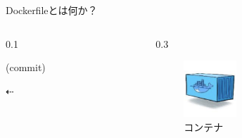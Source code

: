 \begin{frame}{Dockerfileとは何か？}
\begin{columns}[totalwidth=\mytotalwidth]
\begin{column}[T]{0.1\mycolumnwidth}
            \centerline{\footnotesize (commit)}
            \centerline{$\dashleftarrow$}
        \end{column}
        \begin{column}[T]{0.3\mycolumnwidth}
            \begin{figure}
                \centering
                \includegraphics[height=60pt]{img/_container.png}
                \caption{コンテナ}
            \end{figure}
        \end{column}
    \end{columns}
\end{frame}